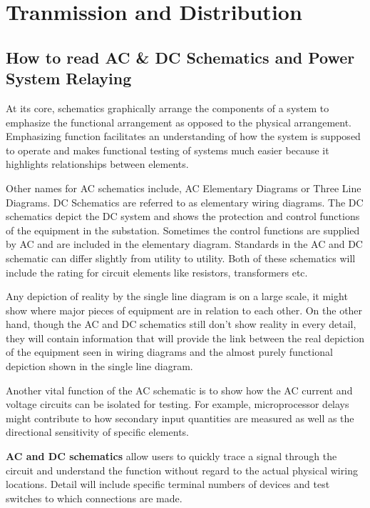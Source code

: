 \chapter{Tranmission and Distribution}

\section{How to read AC \& DC Schematics and Power System Relaying}
\begin{concept}
    At its core, schematics graphically arrange the components of a system to emphasize the functional arrangement as opposed to the physical arrangement. 
    Emphasizing function facilitates an understanding of how the system is supposed to operate and makes functional testing of systems much easier because it highlights relationships between elements.
\end{concept}

Other names for AC schematics include, AC Elementary Diagrams or Three Line Diagrams. 
DC Schematics are referred to as elementary wiring diagrams. 
The DC schematics depict the DC system and shows the protection and control functions of the equipment in the substation. 
Sometimes the control functions are supplied by AC and are included in the elementary diagram. 
Standards in the AC and DC schematic can differ slightly from utility to utility. 
Both of these schematics will include the rating for circuit elements like resistors, transformers etc.

Any depiction of reality by the single line diagram is on a large scale, it might show where major pieces of equipment are in relation to each other. 
On the other hand, though the AC and DC schematics still don’t show reality in every detail, they will contain information that will provide the link between the real depiction of the equipment seen in wiring diagrams and the almost purely functional depiction shown in the single line diagram.

Another vital function of the AC schematic is to show how the AC current and voltage circuits can be isolated for testing. 
For example, microprocessor delays might contribute to how secondary input quantities are measured as well as the directional sensitivity of specific elements.

\begin{concept}
    \textbf{AC and DC schematics} allow users to quickly trace a signal through the circuit and understand the function without regard to the actual physical wiring locations. 
    Detail will include specific terminal numbers of devices and test switches to which connections are made. 
\end{concept}

